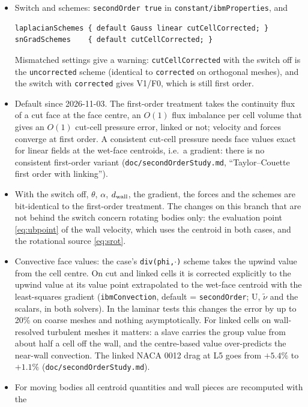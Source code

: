 \documentclass[11pt,a4paper]{article}
\theoremstyle{remark}
\newcommand{\dw}{d_{\rm wall}}
\newcommand{\code}[1]{\texttt{#1}}
\begin{document}
\begin{itemize}\itemsep2pt
\item Switch and schemes: \code{secondOrder true} in \code{constant/ibmProperties}, and
\begin{lstlisting}
laplacianSchemes { default Gauss linear cutCellCorrected; }
snGradSchemes    { default cutCellCorrected; }
\end{lstlisting}
      Mismatched settings give a warning: \code{cutCellCorrected} with the switch off is the
      \code{uncorrected} scheme (identical to \code{corrected} on orthogonal meshes), and the
      switch with \code{corrected} gives V1/F0, which is still first order.
\item Default since 2026-11-03. The first-order treatment takes the continuity flux of a cut
      face at the face centre, an $O(1)$ flux imbalance per cell volume that gives an $O(1)$
      cut-cell pressure error, linked or not; velocity and forces converge at first order. A
      consistent cut-cell pressure needs face values exact for linear fields at the wet-face
      centroids, i.e.\ a gradient: there is no consistent first-order variant
      (\code{doc/secondOrderStudy.md}, ``Taylor--Couette first order with linking'').
\item With the switch off, $\theta$, $\alpha$, $\dw$, the gradient, the forces and the schemes
      are bit-identical to the first-order treatment.
      The changes on this branch that are not behind the switch concern rotating
      bodies only: the evaluation point \eqref{eq:ubpoint} of the wall velocity, which
      uses the centroid in both cases, and the rotational source \eqref{eq:srot}.
\item Convective face values: the case's \code{div(phi,$\cdot$)} scheme takes the upwind value
      from the cell centre. On cut and linked cells it is corrected explicitly to the upwind
      value at its value point extrapolated to the wet-face centroid with the least-squares
      gradient (\code{ibmConvection}, default = \code{secondOrder}; U, $\tilde\nu$ and the
      scalars, in both solvers). In the laminar tests this changes the error by up to 20\% on
      coarse meshes and nothing asymptotically. For linked cells on wall-resolved turbulent
      meshes it matters: a slave carries the group value from about half a cell off the wall,
      and the centre-based value over-predicts the near-wall convection. The linked NACA 0012
      drag at L5 goes from $+5.4\%$ to $+1.1\%$ (\code{doc/secondOrderStudy.md}).
\item For moving bodies all centroid quantities and wall pieces are recomputed with the

\end{itemize}
\end{document}
